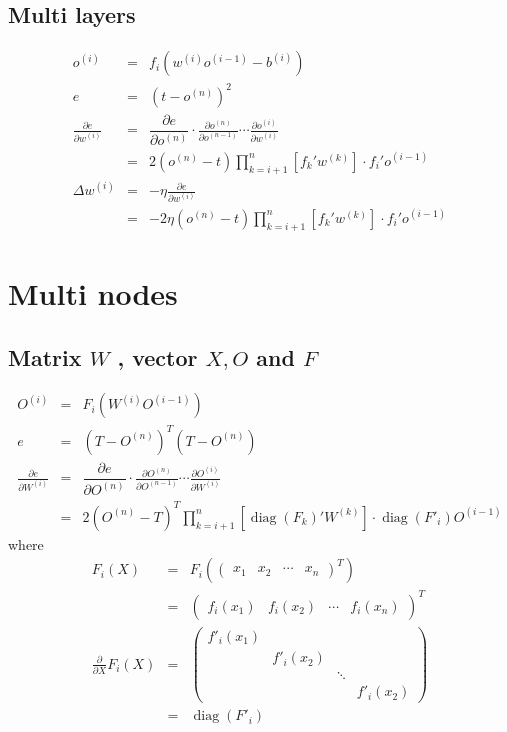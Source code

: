 \documentclass{article}
\newcommand{\cdummy}{\cdot}
\newcommand{\nosymbol}{}
\newcommand{\tmop}[1]{\ensuremath{\operatorname{#1}}}
\begin{document}
\subsection{Multi layers}

\begin{eqnarray*}
  o^{(i)} & = & f_{i}  (w^{(i)} o^{(i-1)} -b_{\nosymbol}^{(i)} )\\
  e & = & (t-o^{(n)} )^{2}\\
  \frac{\partial e}{\partial w^{(i)}} & = & \dfrac{\partial e}{\partial
  o^{(n)}} \cdummy \frac{\partial o^{(n)}}{\partial o^{(n-1)}} \cdots
  \frac{\partial o^{(i)}}{\partial w^{(i)}}\\
  & = & 2 (o^{(n)} -t)  \prod_{k=i+1}^{n} [f_{k}' w^{(k)} ]^{\nosymbol}
  \cdummy f_{i}' o^{(i-1)}\\
  \Delta w^{(i)} & = & - \eta \frac{\partial e}{\partial w^{(i)}}\\
  & = & -2 \eta (o^{(n)} -t)  \prod_{k=i+1}^{n} [f_{k}' w^{(k)} ]^{\nosymbol}
  \cdummy f_{i}' o^{(i-1)}
\end{eqnarray*}

\section{Multi nodes}

\subsection{Matrix $W$ , vector $X,O$ and $F$}

\begin{eqnarray*}
  O^{(i)} & = & F_{i}  (W^{(i)} O^{(i-1)} )\\
  e & = & (T-O^{(n)} )^{T}  (T-O^{(n)} )\\
  \frac{\partial e}{\partial W^{(i)}} & = & \dfrac{\partial e}{\partial
  O^{(n)}} \cdummy \frac{\partial O^{(n)}}{\partial O^{(n-1)}} \cdots
  \frac{\partial O^{(i)}}{\partial W^{(i)}}\\
  & = & 2 (O^{(n)} -T)^{T}  \prod^{n}_{k=i+1} [ \tmop{diag} (F_{k} )' W^{(k)}
  ] \cdummy \tmop{diag} (F'_{i} ) O^{(i-1)}
\end{eqnarray*}
where
\begin{eqnarray*}
  F_{i} (X) & = & F_{i} \left( \left( \begin{array}{cccc}
    x_{1} & x_{2} & \cdots & x_{n}
  \end{array} \right)^{T} \right)\\
  & = & \left( \begin{array}{cccc}
    f_{i} (x_{1} ) & f_{i} (x_{2} ) & \cdots & f_{i} (x_{n} )
  \end{array} \right)^{T}\\
  \frac{\partial}{\partial X} F_{i} (X) & = & \left( \begin{array}{cccc}
    f'_{i} (x_{1} ) &  &  & \\
    & f'_{i} (x_{2} ) &  & \\
    &  & \ddots & \\
    &  &  & f'_{i} (x_{2} )
  \end{array} \right)\\
  & = & \tmop{diag} (F'_{i} )
\end{eqnarray*}
\end{document}
